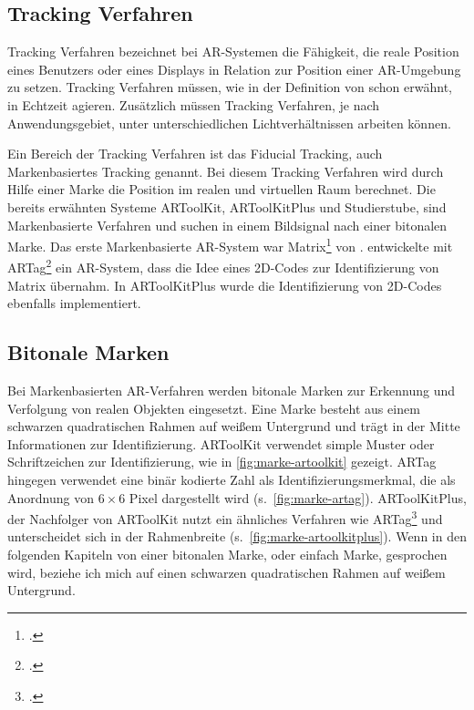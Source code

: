 \subsection{Tracking Verfahren} %
\label{sec:tracking_verfahren}
Tracking Verfahren bezeichnet bei \gls{AR}-Systemen die Fähigkeit, die reale Position eines Benutzers oder eines
 Displays in Relation zur Position einer \gls{AR}-Umgebung zu setzen. Tracking Verfahren müssen, wie in der Definition
 von \citeauthor{azuma97} schon erwähnt, in Echtzeit agieren. Zusätzlich müssen Tracking Verfahren, je nach
 Anwendungsgebiet, unter unterschiedlichen Lichtverhältnissen arbeiten können.

Ein Bereich der Tracking Verfahren ist das Fiducial Tracking, auch Markenbasiertes Tracking genannt. Bei diesem
 Tracking Verfahren wird durch Hilfe einer Marke die Position im realen und virtuellen Raum berechnet. Die bereits
 erwähnten Systeme ARToolKit, ARToolKitPlus und Studierstube, sind Markenbasierte Verfahren und suchen in einem
 Bildsignal nach einer bitonalen Marke. Das erste Markenbasierte \gls{AR}-System war
 Matrix\footcite{rekimoto1998matrix} von \citeauthor{rekimoto1998matrix}. \citeauthor{fiala2004artaga} entwickelte mit
 ARTag\footcite{fiala2004artaga} ein \gls{AR}-System, dass die Idee eines 2D-Codes zur Identifizierung von Matrix
 übernahm. In ARToolKitPlus wurde die Identifizierung von 2D-Codes ebenfalls implementiert.

\subsection{Bitonale Marken} %
\label{sub:bitonalemarken}
Bei Markenbasierten \gls{AR}-Verfahren werden bitonale Marken zur Erkennung und Verfolgung von realen Objekten
 eingesetzt. Eine Marke besteht aus einem schwarzen quadratischen Rahmen auf weißem Untergrund und trägt in der Mitte
 Informationen zur Identifizierung. ARToolKit verwendet simple Muster oder Schriftzeichen zur Identifizierung, wie in
 \autoref{fig:marke-artoolkit} gezeigt. ARTag hingegen verwendet eine binär kodierte Zahl als Identifizierungsmerkmal,
 die als Anordnung von $6 \times 6$ Pixel dargestellt wird (s.~\autoref{fig:marke-artag}). ARToolKitPlus, der
 Nachfolger von ARToolKit nutzt ein ähnliches Verfahren wie ARTag\footcite[Vgl.][S.~142]{wagner07b} und unterscheidet
 sich in der Rahmenbreite (s.~\autoref{fig:marke-artoolkitplus}). Wenn in den folgenden Kapiteln von einer bitonalen
 Marke, oder einfach Marke, gesprochen wird, beziehe ich mich auf einen schwarzen quadratischen Rahmen auf weißem
 Untergrund.


